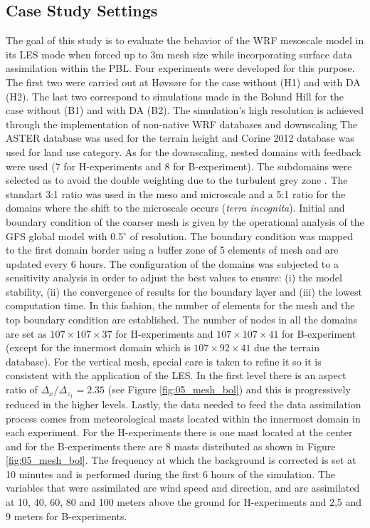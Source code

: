 \subsection{Case Study Settings}
The goal of this study is to evaluate the behavior of the WRF mesoscale model in its LES mode when forced up to 3m mesh size while incorporating surface data assimilation within the PBL. 
Four experiments were developed for this purpose. The first two were carried out at Høvsøre \citep{Pea2015, Pea2013,floors2013wind} for the case without (H1) and with DA (H2). The last two correspond to simulations made in the Bolund Hill \citep{Berg2011,Bechmann2009,Bechmann2011} for the case without (B1) and with DA (B2). The simulation's high resolution is achieved through the implementation of non-native WRF databases and downscaling The ASTER database was used for the terrain height and Corine 2012 database \citep{Pineda2004} was used for land use category. As for the downscaling, nested domains with feedback were used (7 for H-experiments and 8 for B-experiment). The subdomains were selected as to avoid the double weighting due to the turbulent grey zone \citep{Wyngaard2004}. The standart 3:1 ratio was used in the meso and microscale and a 5:1 ratio \citep{Green2015} for the domains where the shift to the microscale occurs (\emph{terra incognita}). Initial and boundary condition of the coarser mesh is given by the operational analysis of the GFS global model with 0.5$^\circ$ of resolution. The boundary condition was mapped to the first domain border using a buffer zone of 5 elements of mesh and are updated every 6 hours. The configuration of the domains was subjected to a sensitivity analysis in order to adjust the best values to ensure: (i) the model stability, (ii) the convergence of results for the boundary layer and (iii) the lowest computation time. In this fashion, the number of elements for the mesh and the top boundary condition are established. The number of nodes in all the domains are set as $107\times107\times37$ for H-experiments and $107\times107\times41$ for B-experiment (except for the innermost domain which is $107\times92\times41$ due the terrain database). For the vertical mesh, special care is taken to refine it so it is consistent with the application of the LES. In the first level there is an aspect ratio of $\Delta_x/\Delta_{z_1}=2.35$ (see Figure \ref{fig:05_mesh_bol}) and this is progressively reduced in the higher levels. Lastly, the data needed to feed the data assimilation process comes from meteorological masts located within the innermost domain in each experiment. For the H-experiments there is one mast located at the center and for the B-experiments there are 8 masts distributed as shown in Figure \ref{fig:05_mesh_bol}. The frequency at which the background is corrected is set at 10 minutes and is performed during the first 6 hours of the simulation. The variables that were assimilated are wind speed and direction, and are assimilated at 10, 40, 60, 80 and 100 meters above the ground for H-experiments and 2,5 and 9 meters for B-experiments.

